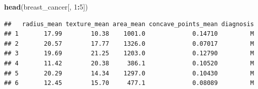 \documentclass[12pt]{article}
\newenvironment{Shaded}{\begin{snugshade}}{\end{snugshade}}
\newcommand{\DecValTok}[1]{\textcolor[rgb]{0.00,0.00,0.81}{#1}}
\newcommand{\FunctionTok}[1]{\textcolor[rgb]{0.13,0.29,0.53}{\textbf{#1}}}
\newcommand{\NormalTok}[1]{#1}
\newcommand{\SpecialCharTok}[1]{\textcolor[rgb]{0.81,0.36,0.00}{\textbf{#1}}}
\begin{document}
\begin{Shaded}
\begin{Highlighting}[]
\FunctionTok{head}\NormalTok{(breast\_cancer[, }\DecValTok{1}\SpecialCharTok{:}\DecValTok{5}\NormalTok{])}
\end{Highlighting}
\end{Shaded}

\begin{verbatim}
##   radius_mean texture_mean area_mean concave_points_mean diagnosis
## 1       17.99        10.38    1001.0             0.14710         M
## 2       20.57        17.77    1326.0             0.07017         M
## 3       19.69        21.25    1203.0             0.12790         M
## 4       11.42        20.38     386.1             0.10520         M
## 5       20.29        14.34    1297.0             0.10430         M
## 6       12.45        15.70     477.1             0.08089         M
\end{verbatim}
\end{document}
